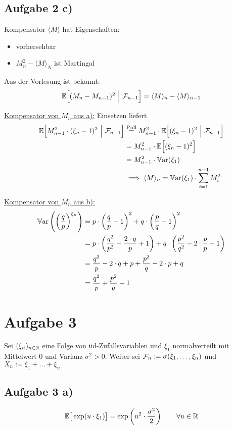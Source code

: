 \documentclass[12pt,a4paper]{article}
\begin{document}
\subsection*{Aufgabe 2 c)}
Kompensator $\langle M\rangle$ hat Eigenschaften:
\begin{itemize}
\item vorhersehbar
\item $M_n^2-\langle M\rangle_N$ ist Martingal
\end{itemize}
Aus der Vorlesung ist bekannt:
\begin{align*}
\mathbb{E}\Big[(M_n-M_{n-1})^2~\Big|~\mathcal{F}_{n-1}\Big]=\langle M\rangle_n-\langle M\rangle_{n-1}
\end{align*}

\underline{Kompensator von $M_n$ aus a):} Einsetzen liefert
\begin{align*}
\mathbb{E}\Big[M_{n-1}^2\cdot(\xi_n-1)^2~\Big|~\mathcal{F}_{n-1}\Big]
&\stackrel{\text{Pull}}{=}
M_{n-1}^2\cdot\mathbb{E}\Big[(\xi_{n}-1)^2~\Big|~\mathcal{F}_{n-1}\Big]\\
&=M_{n-1}^2\cdot\mathbb{E}\Big[(\xi_n-1)^2\Big]\\
&=M_{n-1}^2\cdot\mathbb{V}\text{ar}(\xi_1)\\
&\implies
\langle M\rangle_n=\mathbb{V}\text{ar}(\xi_1)\cdot\sum\limits_{i=1}^{n-1} M_i^2
\end{align*}

\underline{Kompensator von $M_n$ aus b):}\\
\begin{align*}
\mathbb{V}\text{ar}\left(\left(\frac{q}{p}\right)^{\xi_n}\right)
&=p\cdot\left(\frac{q}{p}-1\right)^2+q\cdot\left(\frac{p}{q}-1\right)^2\\
&=p\cdot\left(\frac{q^2}{p^2}-\frac{2\cdot q}{p}+1\right)+q\cdot\left(\frac{p^2}{q^2}-2\cdot\frac{p}{p}+1\right)\\
&=\frac{q^2}{p}-2\cdot q+p+\frac{p^2}{q}-2\cdot p+q\\
&=\frac{q^2}{p}+\frac{p^2}{q}-1
\end{align*}


\section*{Aufgabe 3}
Sei $(\xi_n)_{n\in\mathbb{N}}$ eine Folge von iid-Zufallsvariablen und $\xi_1$ normalverteilt mit Mittelwert 0 und Varianz $\sigma^2>0$. Weiter sei $\mathcal{F}_n:=\sigma(\xi_1,\ldots,\xi_n)$ und\\ $X_n:=\xi_1+\ldots+\xi_n$

\subsection*{Aufgabe 3 a)}
\begin{align*}
\mathbb{E}\big[\exp(u\cdot\xi_1)\big]=\exp\left(u^2\cdot\frac{\sigma^2}{2}\right)\qquad\forall u\in\mathbb{R}
\end{align*}
\end{document}
